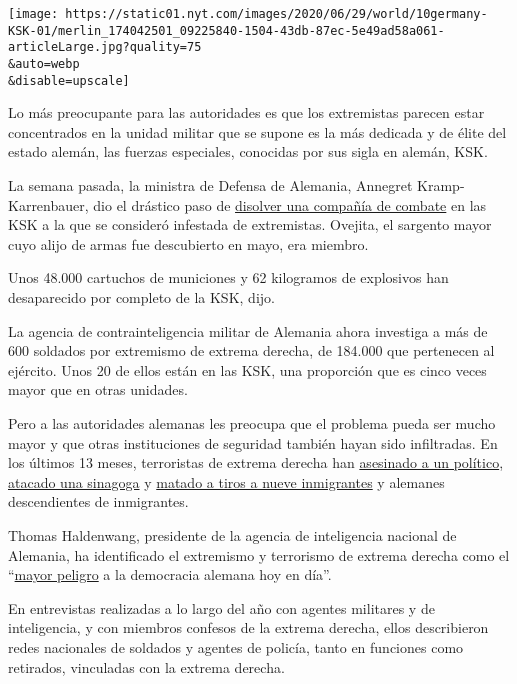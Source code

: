 \texttt{[image: https://static01.nyt.com/images/2020/06/29/world/10germany-KSK-01/merlin\_174042501\_09225840-1504-43db-87ec-5e49ad58a061-articleLarge.jpg?quality=75\\\&auto=webp\\\&disable=upscale]}

Lo más preocupante para las autoridades es que los extremistas parecen
estar concentrados en la unidad militar que se supone es la más dedicada
y de élite del estado alemán, las fuerzas especiales, conocidas por sus
sigla en alemán, KSK.

La semana pasada, la ministra de Defensa de Alemania, Annegret
Kramp-Karrenbauer, dio el drástico paso de
\href{https://www.nytimes.com/2020/07/01/world/europe/german-special-forces-far-right.html}{disolver
una compañía de combate} en las KSK a la que se consideró infestada de
extremistas. Ovejita, el sargento mayor cuyo alijo de armas fue
descubierto en mayo, era miembro.

Unos 48.000 cartuchos de municiones y 62 kilogramos de explosivos han
desaparecido por completo de la KSK, dijo.

La agencia de contrainteligencia militar de Alemania ahora investiga a
más de 600 soldados por extremismo de extrema derecha, de 184.000 que
pertenecen al ejército. Unos 20 de ellos están en las KSK, una
proporción que es cinco veces mayor que en otras unidades.

Pero a las autoridades alemanas les preocupa que el problema pueda ser
mucho mayor y que otras instituciones de seguridad también hayan sido
infiltradas. En los últimos 13 meses, terroristas de extrema derecha han
\href{https://www.nytimes.com/2019/06/17/world/europe/germany-terrorism-walter-lubcke.html}{asesinado
a un político},
\href{https://www.nytimes.com/2019/10/10/world/europe/germany-synagogue-attack.html?searchResultPosition=10}{atacado
una sinagoga} y
\href{https://www.nytimes.com/2020/02/20/world/europe/germany-hanau-shisha-bar-shooting.html?searchResultPosition=28}{matado
a tiros a nueve inmigrantes} y alemanes descendientes de inmigrantes.

Thomas Haldenwang, presidente de la agencia de inteligencia nacional de
Alemania, ha identificado el extremismo y terrorismo de extrema derecha
como el
``\href{https://www.nytimes.com/2020/02/21/world/europe/germany-shooting-terrorism.html?searchResultPosition=25}{mayor
peligro} a la democracia alemana hoy en día''.

En entrevistas realizadas a lo largo del año con agentes militares y de
inteligencia, y con miembros confesos de la extrema derecha, ellos
describieron redes nacionales de soldados y agentes de policía, tanto en
funciones como retirados, vinculadas con la extrema derecha.

